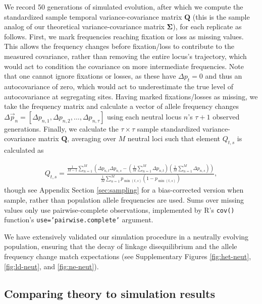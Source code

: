 \documentclass[11pt]{article}
\newcommand{\E}{\mathbb{E}}
\DeclareMathOperator{\cov}{Cov}
\begin{document}
We record 50 generations of simulated evolution, after which we compute
the standardized sample temporal variance-covariance matrix $\mathbf{Q}$
(this is the sample analog of our theoretical variance-covariance matrix
$\mathbf{\Sigma}$), for each replicate as follows. First, we mark
frequencies reaching fixation or loss as missing values. This allows the
  frequency changes before fixation/loss to contribute to the measured
  covariance, rather than removing the entire locus's trajectory, which would
  act to condition the covariance on more intermediate frequencies. Note that
  one cannot ignore fixations or losses, as these have $\Delta p_t=0$ and thus
  an autocovariance of zero, which would act to underestimate the true level of
autocovariance at segregating sites. Having marked fixations/losses as missing,
we take the frequency matrix and calculate a vector of allele frequency
changes $\Delta \vec{p}_n = [\Delta p_{n,1}, \Delta p_{n,2}, \ldots, \Delta
p_{n,\tau}]$ using each neutral locus $n$'s $\tau+1$ observed generations.
Finally, we calculate the $\tau \times \tau$ sample standardized
variance-covariance matrix $\mathbf{Q}$, averaging over $M$ neutral loci such
that element $Q_{t,s}$ is calculated as

\begin{align}
  Q_{t,s} = \frac{\frac{1}{M - 1} \sum_{n=1}^M \left( \Delta p_{n,t} \Delta p_{n,s} - \left(\frac{1}{M} \sum_{n=1}^M \Delta p_{n,t}\right) \left( \frac{1}{M} \sum_{n=1}^M \Delta p_{n,s} \right) \right)}{
  \frac{1}{M} \sum_{n=1}^M p_{\min(t,s)} \left(1 - p_{\min(t,s)}\right)
  },
  \label{eq:ave-temp-autocov}
\end{align}
%
though see Appendix Section \ref{sec:sampling} for a bias-corrected version
when sample, rather than population allele frequencies are used. Sums over
missing values only use pairwise-complete observations, implemented by R's
\texttt{cov()} function's \texttt{use='pairwise.complete'} argument.

We have extensively validated our simulation procedure in a neutrally evolving
population, ensuring that the decay of linkage disequilibrium and the allele
frequency change match expectations (see Supplementary Figures
\ref{fig:het-neut}, \ref{fig:ld-neut}, and \ref{fig:ne-neut}). 


\subsection{Comparing theory to simulation results}
\label{sec:ml-sim-res}
\end{document}
